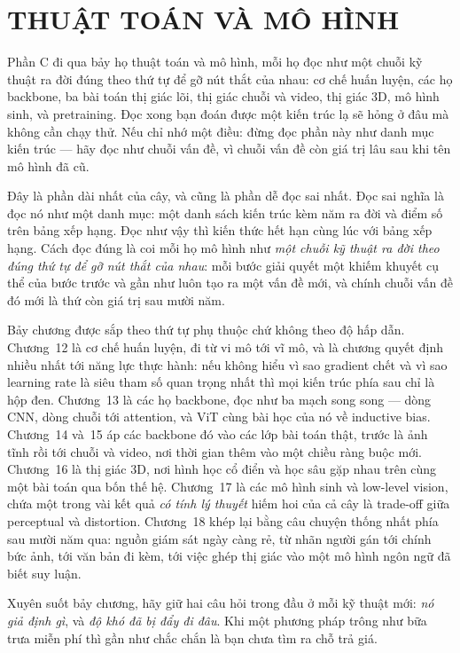 \documentclass[../deep_learning.tex]{subfiles}
\begin{document}
\part{THUẬT TOÁN VÀ MÔ HÌNH}
\begin{tomtat}
Phần C đi qua bảy họ thuật toán và mô hình, mỗi họ đọc như một chuỗi kỹ thuật ra đời đúng theo thứ tự để gỡ nút thắt của nhau: cơ chế huấn luyện, các họ backbone, ba bài toán thị giác lõi, thị giác chuỗi và video, thị giác 3D, mô hình sinh, và pretraining. Đọc xong bạn đoán được một kiến trúc lạ sẽ hỏng ở đâu mà không cần chạy thử. Nếu chỉ nhớ một điều: đừng đọc phần này như danh mục kiến trúc --- hãy đọc như chuỗi vấn đề, vì chuỗi vấn đề còn giá trị lâu sau khi tên mô hình đã cũ.
\end{tomtat}

Đây là phần dài nhất của cây, và cũng là phần dễ đọc sai nhất. Đọc sai nghĩa là đọc nó như một danh mục: một danh sách kiến trúc kèm năm ra đời và điểm số trên bảng xếp hạng. Đọc như vậy thì kiến thức hết hạn cùng lúc với bảng xếp hạng. Cách đọc đúng là coi mỗi họ mô hình như \emph{một chuỗi kỹ thuật ra đời theo đúng thứ tự để gỡ nút thắt của nhau}: mỗi bước giải quyết một khiếm khuyết cụ thể của bước trước và gần như luôn tạo ra một vấn đề mới, và chính chuỗi vấn đề đó mới là thứ còn giá trị sau mười năm.

Bảy chương được sắp theo thứ tự phụ thuộc chứ không theo độ hấp dẫn. Chương~12 là cơ chế huấn luyện, đi từ vi mô tới vĩ mô, và là chương quyết định nhiều nhất tới năng lực thực hành: nếu không hiểu vì sao gradient chết và vì sao learning rate là siêu tham số quan trọng nhất thì mọi kiến trúc phía sau chỉ là hộp đen. Chương~13 là các họ backbone, đọc như ba mạch song song --- dòng CNN, dòng chuỗi tới attention, và ViT cùng bài học của nó về inductive bias. Chương~14 và~15 áp các backbone đó vào các lớp bài toán thật, trước là ảnh tĩnh rồi tới chuỗi và video, nơi thời gian thêm vào một chiều ràng buộc mới. Chương~16 là thị giác 3D, nơi hình học cổ điển và học sâu gặp nhau trên cùng một bài toán qua bốn thế hệ. Chương~17 là các mô hình sinh và low-level vision, chứa một trong vài kết quả \emph{có tính lý thuyết} hiếm hoi của cả cây là trade-off giữa perceptual và distortion. Chương~18 khép lại bằng câu chuyện thống nhất phía sau mười năm qua: nguồn giám sát ngày càng rẻ, từ nhãn người gán tới chính bức ảnh, tới văn bản đi kèm, tới việc ghép thị giác vào một mô hình ngôn ngữ đã biết suy luận.

Xuyên suốt bảy chương, hãy giữ hai câu hỏi trong đầu ở mỗi kỹ thuật mới: \emph{nó giả định gì}, và \emph{độ khó đã bị đẩy đi đâu}. Khi một phương pháp trông như bữa trưa miễn phí thì gần như chắc chắn là bạn chưa tìm ra chỗ trả giá.








\ifSubfilesClassLoaded{\printbibliography[title={Nguồn}]}{}
\end{document}
